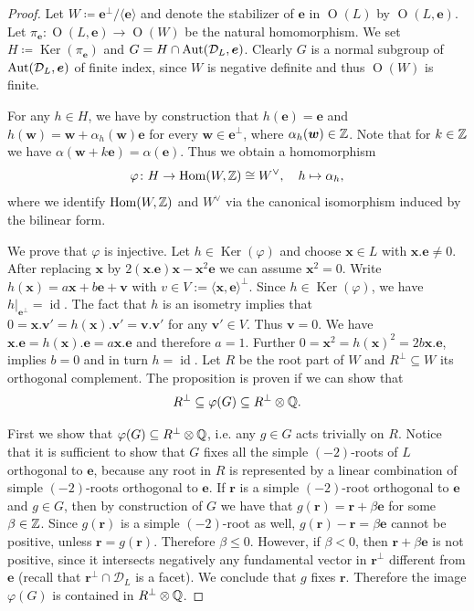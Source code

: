 \documentclass[11pt,letterpaper]{amsart}
\newcommand{\vect}[1]{\boldsymbol{#1}}
\DeclareMathOperator{\Hom}{Hom}
\DeclareMathOperator{\Ker}{Ker}
\DeclareMathOperator{\id}{id}
\DeclareMathOperator{\Or}{O}
\begin{document}
\begin{proof}
Let $W \coloneqq \vect{e}^\perp / \langle\vect{e}\rangle$ and denote the stabilizer of $\vect{e}$ in $\Or(L)$ by $\Or(L,\vect{e})$. Let $\pi_{\vect{e}}:\Or(L,\vect{e})\rightarrow \Or(W)$ be the natural homomorphism.
We set $H \coloneqq \Ker(\pi_{\vect{e}})$ and $G = H \cap \Stabe$. Clearly $G$ is a normal subgroup of $\Stabe$ of finite index, since $W$ is negative definite and thus $\Or(W)$ is finite.

For any $h\in H$, we have by construction that $h(\vect{e})=\vect{e}$ and $h(\vect{w})=\vect{w}+\alpha_h(\vect{w})\vect{e}$ for every $\vect{w}\in \vect{e}^\perp$, where $\alpha_h(\vect{w}) \in \ZZ$. Note that for $k \in \mathbb{Z}$ we have $\alpha(\vect{w} +k \vect{e})=\alpha(\vect{e})$.
Thus we obtain a homomorphism 
\[\varphi\colon H \to \Hom(W,\ZZ)\cong W^\vee, \quad  h \mapsto \alpha_h,\]
where we identify $\Hom(W,\ZZ)$ and $W^\vee$ via the canonical isomorphism induced by the bilinear form. 

We prove that $\varphi$ is injective.
Let $h \in \Ker(\varphi)$ and choose $\vect{x}\in L$ with $\vect{x}.\vect{e}\neq 0$. After replacing $\vect{x}$ by $2(\vect{x}.\vect{e}) \vect{x} - \vect{x}^2 \vect{e}$ we can assume $\vect{x}^2=0$. Write $h(\vect{x}) = a \vect{x}+b\vect{e}+\vect{v}$ with $v \in V:=\langle \vect{x},\vect{e}\rangle^\perp$.
Since $h \in \Ker(\varphi)$, we have $h|_{\vect{e}^\perp}=\id$. The fact that $h$ is an isometry implies that $0 = \vect{x}.\vect{v}' = h(\vect{x}).\vect{v}'=\vect{v}.\vect{v}'$ for any $\vect{v}' \in V$. Thus $\vect{v}=0$. We have $\vect{x}.\vect{e}=h(\vect{x}).\vect{e} = a \vect{x}.\vect{e}$ and therefore $a=1$. 
Further $0=\vect{x}^2=h(\vect{x})^2=2b \vect{x}.\vect{e}$, implies $b=0$ and in turn $h=\id$. 
Let $R$ be the root part of $W$ and $R^\perp \subseteq W$ its orthogonal complement.
The proposition is proven if we can show that \[R^\perp \subseteq \varphi(G)\subseteq R^\perp\otimes \mathbb{Q}.\]

First we show that $\varphi(G)\subseteq R^\perp\otimes \mathbb{Q}$, i.e. any $g \in G$ acts trivially on $R$.
Notice that it is sufficient to show that $G$ fixes all the simple $(-2)$-roots of $L$ orthogonal to $\vect{e}$, because any root in $R$ is represented by a linear combination of simple $(-2)$-roots orthogonal to $\vect{e}$.
If $\vect{r}$ is a simple $(-2)$-root orthogonal to $\vect{e}$ and $g\in G$, then by construction of $G$ we have that $g(\vect{r})=\vect{r}+\beta \vect{e}$ for some $\beta \in \mathbb{Z}$. Since $g(\vect{r})$ is a simple $(-2)$-root as well,  $g(\vect{r})-\vect{r}=\beta \vect{e}$ cannot be positive, unless $\vect{r}=g(\vect{r})$. Therefore $\beta \leq 0$.
However, if $\beta < 0$, then $\vect{r}+\beta \vect{e}$ is not positive, since it intersects negatively any fundamental vector in $\vect{r}^\perp$ different from $\vect{e}$ (recall that $\vect{r}^\perp \cap \mathcal{D}_L$ is a facet). We conclude that $g$ fixes $\vect{r}$.
Therefore the image $\varphi(G)$ is contained in $R^\perp \otimes \mathbb{Q}$.


\end{proof}
\end{document}
